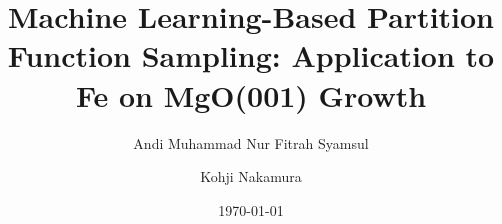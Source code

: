 \documentclass[%
 preprint,
 amsmath,amssymb,
 aps,
]{revtex4-2}
\begin{document}
\title{Machine Learning-Based Partition Function Sampling: Application to Fe on MgO(001) Growth}

\author{Andi Muhammad Nur Fitrah Syamsul}
\author{Kohji Nakamura}

\date{\today}

\begin{abstract}

\end{abstract}

\maketitle







\end{document}
